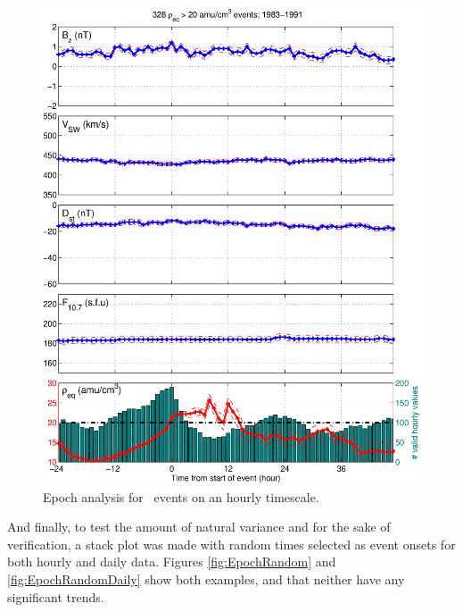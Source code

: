 \begin{figure}[htp!]
	\centering
	\includegraphics[width=1\linewidth]{Figures/StormAvs/stormavs-mass-gt20-GOES6}
	\caption{Epoch analysis for \req\ events on an hourly timescale.}
	\label{fig:EpochRho}
\end{figure}

And finally, to test the amount of natural variance and for the sake of verification, a stack plot was made with random times selected as event onsets for both hourly and daily data. Figures \ref{fig:EpochRandom} and \ref{fig:EpochRandomDaily} show both examples, and that neither have any significant trends.

